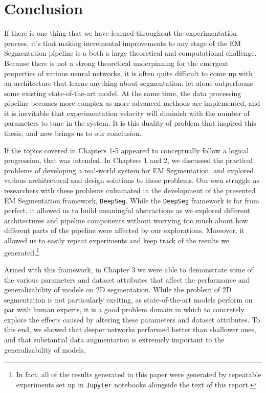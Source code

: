 \chapter{Conclusion}

If there is one thing that we have learned throughout the experimentation process, it's that making incremental improvements to any stage of the EM Segmentation pipeline is a both a large theoretical and computational challenge. Because there is not a strong theoretical underpinning for the emergent properties of various neural networks, it is often quite difficult to come up with an architecture that learns anything about segmentation, let alone outperforms some existing state-of-the-art model. At the same time, the data processing pipeline becomes more complex as more advanced methods are implemented, and it is inevitable that experimentation velocity will diminish with the number of parameters to tune in the system. It is this duality of problem that inspired this thesis, and now brings us to our conclusion.

If the topics covered in Chapters 1-5 appeared to conceptually follow a logical progression, that was intended. In Chapters 1 and 2, we discussed the practical problems of developing a real-world system for EM Segmentation, and explored various architectural and design solutions to these problems. Our own struggle as researchers with these problems culminated in the development of the presented EM Segmentation framework, \texttt{DeepSeg}. While the \texttt{DeepSeg} framework is far from perfect, it allowed us to build meaningful abstractions as we explored different architectures and pipeline components without worrying too much about how different parts of the pipeline were affected by our explorations. Moreover, it allowed us to easily repeat experiments and keep track of the results we generated.\footnote{In fact, all of the results generated in this paper were generated by repeatable experiments set up in \texttt{Jupyter} notebooks alongside the text of this report.}

Armed with this framework, in Chapter 3 we were able to demonstrate some of the various parameters and dataset attributes that affect the performance and generalizability of models on 2D segmentation. While the problem of 2D segmentation is not particularly exciting, as state-of-the-art models perform on par with human experts, it is a good problem domain in which to concretely explore the effects caused by altering these parameters and dataset attributes. To this end, we showed that deeper networks performed better than shallower ones, and that substantial data augmentation is extremely important to the generalizability of models.

